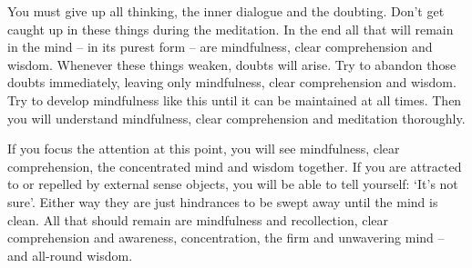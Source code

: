 You must give up all thinking, the inner dialogue and the doubting. Don't get caught up in these things during the meditation. In the end all that will remain in the mind -- in its purest form -- are mindfulness, clear comprehension and wisdom. Whenever these things weaken, doubts will arise. Try to abandon those doubts immediately, leaving only mindfulness, clear comprehension and wisdom. Try to develop mindfulness like this until it can be maintained at all times. Then you will understand mindfulness, clear comprehension and meditation thoroughly.

If you focus the attention at this point, you will see mindfulness, clear comprehension, the concentrated mind and wisdom together. If you are attracted to or repelled by external sense objects, you will be able to tell yourself: `It's not sure'. Either way they are just hindrances to be swept away until the mind is clean. All that should remain are mindfulness and recollection, clear comprehension and awareness, concentration, the firm and unwavering mind -- and all-round wisdom.
